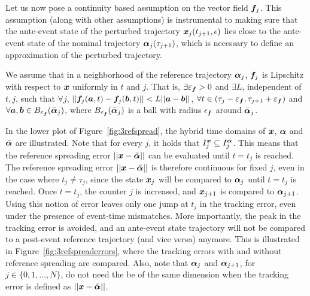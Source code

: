 \documentclass[../DC2019003Bouma.tex]{subfiles}
\begin{document}
Let us now pose a continuity based assumption on the vector field ${\boldsymbol{f}}_j$. This assumption (along with other assumptions) is instrumental to making sure that the ante-event state of the perturbed trajectory ${\boldsymbol{x}}_j(t_{j+1},\epsilon)$ lies close to the ante-event state of the nominal trajectory $\boldsymbol{\alpha}_j(\tau_{j+1})$, which is necessary to define an approximation of the perturbed trajectory.

\begin{sloppypar}
\begin{myass}\label{ass:lipschitz}
We assume that in a neighborhood of the reference trajectory $\boldsymbol{\alpha}_j$, ${\boldsymbol{f}}_j$ is Lipschitz with respect to ${\boldsymbol{x}}$ uniformly in $t$ and $j$. That is, $\exists\varepsilon_{{\boldsymbol{f}}}>0$ and $\exists L$, independent of $t,j$, such that $\forall j$, $||{\boldsymbol{f}}_j({\boldsymbol{a}},t) - {\boldsymbol{f}}_j({\boldsymbol{b}},t)||<L||{\boldsymbol{a}}-{\boldsymbol{b}}||$, $\forall t\in (\tau_j - \varepsilon_{{\boldsymbol{f}}},\tau_{j+1} + \varepsilon_{{\boldsymbol{f}}})$ and $\forall {\boldsymbol{a}},{\boldsymbol{b}}\in B_{\varepsilon_{{\boldsymbol{f}}}}(\bar{\boldsymbol{\alpha}}_j)$, where $B_{\varepsilon_{{\boldsymbol{f}}}}(\bar{\boldsymbol{\alpha}}_j)$ is a ball with radius $\epsilon_{{\boldsymbol{f}}}$ around $\bar{\boldsymbol{\alpha}}_j$.
\end{myass}
\end{sloppypar}

In the lower plot of Figure~\ref{fig:3refspread}, the hybrid time domains of ${\boldsymbol{x}}$, $\boldsymbol{\alpha}$ and $\bar{\boldsymbol{\alpha}}$ are illustrated. Note that for every $j$, it holds that $I^{{\boldsymbol{x}}}_j\subseteq I^{\bar{\boldsymbol{\alpha}}}_j$. This means that the reference spreading error $||{\boldsymbol{x}}-\bar{\boldsymbol{\alpha}}||$ can be evaluated until $t=t_j$ is reached. The reference spreading error $||{\boldsymbol{x}}-\bar{\boldsymbol{\alpha}}||$ is therefore continuous for fixed $j$, even in the case where $t_j\neq\tau_j$, since the state ${\boldsymbol{x}}_j$ will be compared to $\boldsymbol{\alpha}_j$ until $t=t_j$ is reached. Once $t=t_j$, the counter $j$ is increased, and ${\boldsymbol{x}}_{j+1}$ is compared to $\boldsymbol{\alpha}_{j+1}$. Using this notion of error leaves only one jump at $t_j$ in the tracking error, even under the presence of event-time mismatches. More importantly, the peak in the tracking error is avoided, and an ante-event state trajectory will not be compared to a post-event reference trajectory (and vice versa) anymore. This is illustrated in Figure~\ref{fig:3refspreaderrors}, where the tracking errors with and without reference spreading are compared. Also, note that $\boldsymbol{\alpha}_j$ and $\boldsymbol{\alpha}_{j+1}$, for $j\in\{0,1,\dots,N\}$, do not need the be of the same dimension when the tracking error is defined as $||{\boldsymbol{x}}-\bar{\boldsymbol{\alpha}}||$.
\end{document}
